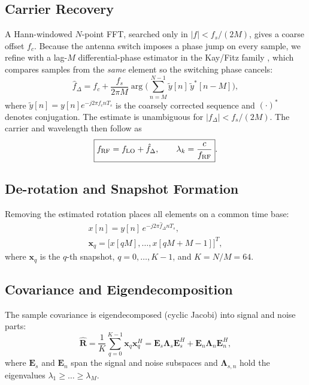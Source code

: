 \documentclass[conference]{IEEEtran}
\newcommand{\vect}[1]{\mathbf{#1}}
\begin{document}
\subsection{Carrier Recovery}
A Hann-windowed $N$-point FFT, searched only in $|f|<f_s/(2M)$, gives a coarse offset $f_c$. Because the antenna switch imposes a phase jump on every sample, we refine with a lag-$M$ differential-phase estimator in the Kay/Fitz family \cite{kay,fitz}, which compares samples from the \emph{same} element so the switching phase cancels:
\begin{equation}
\boxed{\hat f_\Delta=f_c+\frac{f_s}{2\pi M}\arg\!\Big(\sum_{n=M}^{N-1}\tilde y[n]\,\tilde y^{*}[n-M]\Big)},
\label{eq:fine}
\end{equation}
where $\tilde y[n]=y[n]e^{-j2\pi f_cnT_s}$ is the coarsely corrected sequence and $(\cdot)^*$ denotes conjugation. The estimate is unambiguous for $|f_\Delta|<f_s/(2M)$. The carrier and wavelength then follow as
\begin{equation}
\boxed{f_{\rm RF}=f_{\rm LO}+\hat f_\Delta,\qquad \lambda_k=\frac{c}{f_{\rm RF}}}.
\label{eq:lam}
\end{equation}

\subsection{De-rotation and Snapshot Formation}
Removing the estimated rotation places all elements on a common time base:
\begin{equation}
\begin{gathered}
\boxed{x[n]=y[n]\,e^{-j2\pi\hat f_\Delta nT_s}},\\
\vect{x}_q=\big[x[qM],\dots,x[qM{+}M{-}1]\big]^{T},
\end{gathered}
\label{eq:derot}
\end{equation}
where $\vect{x}_q$ is the $q$-th snapshot, $q=0,\dots,K{-}1$, and $K=N/M=64$.

\subsection{Covariance and Eigendecomposition}
The sample covariance is eigendecomposed (cyclic Jacobi) into signal and noise parts:
\begin{equation}
\boxed{\hat{\vect{R}}=\frac{1}{K}\sum_{q=0}^{K-1}\vect{x}_q\vect{x}_q^{H}=\vect{E}_s\boldsymbol{\Lambda}_s\vect{E}_s^{H}+\vect{E}_n\boldsymbol{\Lambda}_n\vect{E}_n^{H}},
\label{eq:cov}
\end{equation}
where $\vect{E}_s$ and $\vect{E}_n$ span the signal and noise subspaces and $\boldsymbol{\Lambda}_{s,n}$ hold the eigenvalues $\lambda_1\ge\dots\ge\lambda_M$.
\end{document}
